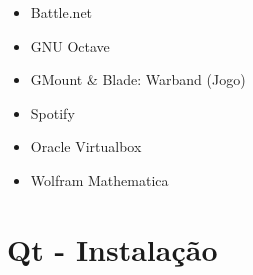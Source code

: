 \documentclass[10pt]{beamer}
\theoremstyle{remark}
\theoremstyle{definition}
\begin{document}
\begin{frame}[allowframebreaks]
\begin{itemize}
		\item Battle.net
		
		\item GNU Octave
		
		\item GMount \& Blade: Warband (Jogo)
		
		\item Spotify
		
		\item Oracle Virtualbox
		
		\item Wolfram Mathematica
	\end{itemize}

\end{frame}

\section{Qt - Instalação}
\end{document}
